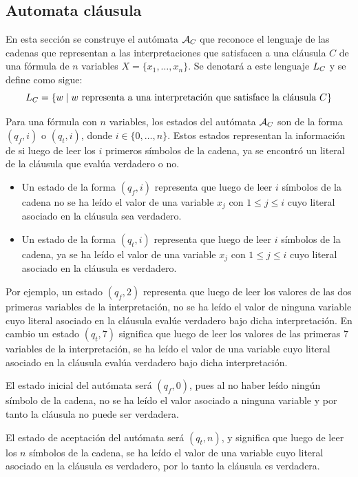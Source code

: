 \subsection{Automata cláusula}
En esta sección se construye el autómata $\mathcal{A}_C$ que reconoce el lenguaje de las cadenas que representan a las interpretaciones que satisfacen a una cláusula $C$ de una fórmula de $n$ variables $X= \{x_1, \ldots, x_n\}$. Se denotará a este lenguaje $L_{C}$ y se define como sigue:
$$
    L_{C} = \{ w \;|\; w \text{ representa a una interpretación que satisface la cláusula } C \}
$$

Para una fórmula con $n$ variables, los estados del autómata $\mathcal{A}_{C}$ son de la forma $(q_f, i)$ o $(q_t, i)$, donde $i \in \{0, \ldots, n\}$. Estos estados representan la información de si luego de leer los $i$ primeros símbolos de la cadena, ya se encontró un literal de la cláusula que evalúa verdadero o no.

\begin{itemize}
    \item Un estado de la forma $(q_f, i)$ representa que luego de leer $i$ símbolos de la cadena no se ha leído el valor de una variable $x_j$ con $1 \leq j \leq i$ cuyo literal asociado en la cláusula sea verdadero.
    \item Un estado de la forma $(q_t, i)$ representa que luego de leer $i$ símbolos de la cadena, ya se ha leído el valor de una variable $x_j$ con $1 \leq j \leq i$ cuyo literal asociado en la cláusula es verdadero.
\end{itemize}

Por ejemplo, un estado $(q_f, 2)$ representa que luego de leer los valores de las dos primeras variables de la interpretación, no se ha leído el valor de ninguna variable cuyo literal asociado en la cláusula evalúe verdadero bajo dicha interpretación. En cambio un estado $(q_t, 7)$ significa que luego de leer los valores de las primeras 7 variables de la interpretación, se ha leído el valor de una variable cuyo literal asociado en la cláusula evalúa verdadero bajo dicha interpretación.

El estado inicial del autómata será $(q_f, 0)$, pues al no haber leído ningún símbolo de la cadena, no se ha leído el valor asociado a ninguna variable y por tanto la cláusula no puede ser verdadera.

El estado de aceptación del autómata será $(q_t, n)$, y significa que luego de leer los $n$ símbolos de la cadena, se ha leído el valor de una variable cuyo literal asociado en la cláusula es verdadero, por lo tanto la cláusula es verdadera.

